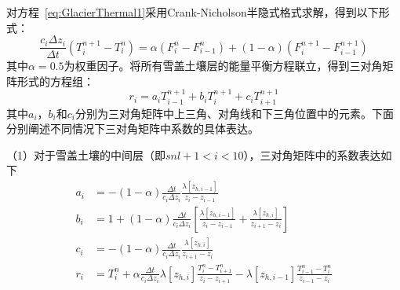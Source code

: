 对方程~\eqref{eq:GlacierThermal1}采用Crank-Nicholson半隐式格式求解，得到以下形式：
\begin{equation}
    \frac{c_i\Delta z_i}{\Delta t}\left(T^{n+1}_i - T^n_i\right)=\alpha \left(F^n_i - F^n_{i-1}\right) + \left(1-\alpha \right) \left(F^{n+1}_i - F^{n+1}_{i-1}\right)
\end{equation}
其中$\alpha = 0.5$为权重因子。将所有雪盖土壤层的能量平衡方程联立，得到三对角矩阵形式的方程组：
\begin{equation}
    r_i = a_i T^{n+1}_{i-1} + b_i T^{n+1}_i + c_i T^{n+1}_{i+1}
\end{equation}
其中$a_i$，$b_i$和$c_i$分别为三对角矩阵中上三角、对角线和下三角位置中的元素。下面分别阐述不同情况下三对角矩阵中系数的具体表达。

（1）对于雪盖土壤的中间层（即$snl+1<i<10$），三对角矩阵中的系数表达如下
\begin{equation}
    \begin{aligned}
        a_i &= -\left(1-\alpha \right) \frac{\Delta t}{c_i \Delta z_i} \frac{\lambda \left[z_{h,i-1}\right]}{z_i-z_{i-1}} \\
        b_i &= 1+\left(1-\alpha \right) \frac{\Delta t}{c_i \Delta z_i} \left[\frac{\lambda \left[z_{h,i-1}\right]}{z_i-z_{i-1}} + \frac{\lambda \left[z_{h,i}\right]}{z_{i+1}-z_i}\right] \\
        c_i &= -\left(1-\alpha \right)\frac{\Delta t}{c_i\Delta z_i}\frac{\lambda \left[z_{h,i}\right]}{z_{i+1}-z_i} \\
        r_i &= T_{i}^{n}+\alpha \frac{\Delta t}{c_{i} \Delta z_{i}} \lambda\left[z_{h, i}\right] \frac{T_{i}^{n}-T_{i+1}^{n}}{z_{i}-z_{i+1}}-\lambda\left[z_{h, i-1}\right] \frac{T_{i-1}^{n}-T_{i}^{n}}{z_{i-1}-z_{i}}
    \end{aligned}
\end{equation}

